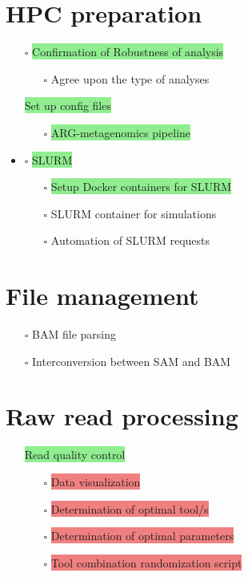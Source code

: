 \documentclass[11pt]{article}
\newcommand{\done}{\checkmark}  %
\newcommand{\pending}{$\square$}  %
\newcommand{\highlightessential}[1]{\colorbox{lightgreen}{#1}}  %
\newcommand{\highlightoptional}[1]{\colorbox{lightorange}{#1}}  %
\newcommand{\highlightrobust}[1]{\colorbox{lightcoral}{#1}}  %
\begin{document}
	\section{HPC preparation}
	\begin{itemize}
		\item [\pending] \highlightessential{Confirmation of Robustness of analysis}
			\begin{itemize}
				\item [\pending] Agree upon the type of analyses
			\end{itemize}
			\item [\done] \highlightessential{Set up config files}
		\begin {itemize}
		\item [\pending] \highlightessential{ARG-metagenomics pipeline}
		
		
	\end{itemize}
		\item [\pending] \highlightessential{SLURM}
		\begin{itemize}
			\item [\pending] \highlightessential{Setup Docker containers for SLURM}
			\item [\pending] \highlightoptional{SLURM container for simulations}
			\item [\pending] \highlightoptional{Automation of SLURM requests}
		\end{itemize}

	\end{itemize}
	
\section{File management}
\begin{itemize}
	\item [\pending] \highlightoptional{BAM file parsing}
	\item [\pending] \highlightoptional{Interconversion between SAM and BAM}
\end{itemize}

\section{Raw read processing}
\begin{itemize}
	\item [\done] \highlightessential{Read quality control}
	\begin{itemize}
		\item [\pending] \highlightrobust{Data visualization}
		\item [\pending] \highlightrobust{Determination of optimal tool/s}
		\item [\pending] \highlightrobust{Determination of optimal parameters}
		\item [\pending] \highlightrobust{Tool combination randomization script}
	\end{itemize}
\end{itemize}
	
\end{document}
